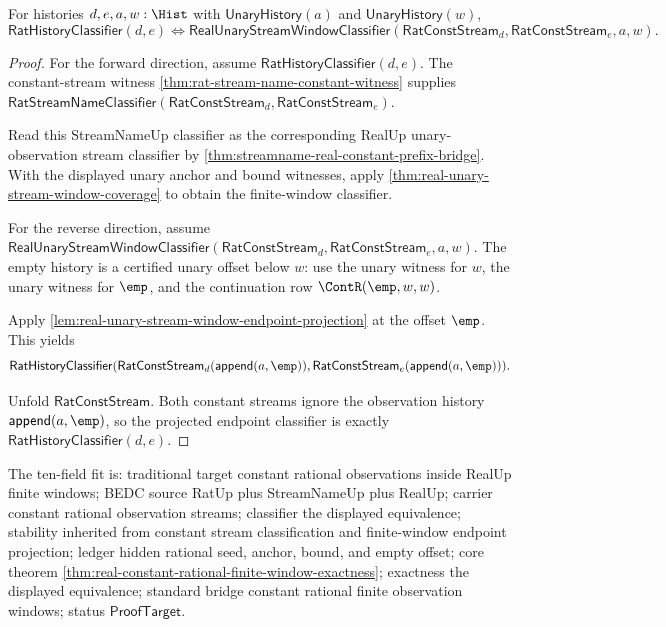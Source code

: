 \begin{theorem}
\label{thm:real-constant-rational-finite-window-exactness}
For histories $d,e,a,w:\Hist$ with $\mathsf{UnaryHistory}(a)$ and
$\mathsf{UnaryHistory}(w)$,
$$
\mathsf{RatHistoryClassifier}(d,e)
\Longleftrightarrow
\mathsf{RealUnaryStreamWindowClassifier}(\mathsf{RatConstStream}_d,
\mathsf{RatConstStream}_e,a,w).
$$
\end{theorem}
\begin{proof}
For the forward direction, assume
$\mathsf{RatHistoryClassifier}(d,e)$. The constant-stream witness
\autoref{thm:rat-stream-name-constant-witness} supplies
$\mathsf{RatStreamNameClassifier}(\mathsf{RatConstStream}_d,
\mathsf{RatConstStream}_e)$.

Read this StreamNameUp classifier as the corresponding RealUp unary-observation
stream classifier by \autoref{thm:streamname-real-constant-prefix-bridge}. With
the displayed unary anchor and bound witnesses, apply
\autoref{thm:real-unary-stream-window-coverage} to obtain the finite-window
classifier.

For the reverse direction, assume
$\mathsf{RealUnaryStreamWindowClassifier}(\mathsf{RatConstStream}_d,
\mathsf{RatConstStream}_e,a,w)$. The empty history is a certified unary offset
below $w$: use the unary witness for $w$, the unary witness for $\emp$, and the
continuation row $\ContR(\emp,w,w)$.

Apply
\autoref{lem:real-unary-stream-window-endpoint-projection} at the offset
$\emp$. This yields
$$
\mathsf{RatHistoryClassifier}(
\mathsf{RatConstStream}_d(\mathsf{append}(a,\emp)),
\mathsf{RatConstStream}_e(\mathsf{append}(a,\emp))).
$$

Unfold $\mathsf{RatConstStream}$. Both constant streams ignore the observation
history $\mathsf{append}(a,\emp)$, so the projected endpoint classifier is
exactly $\mathsf{RatHistoryClassifier}(d,e)$.
\end{proof}

The ten-field fit is: traditional target constant rational observations inside
RealUp finite windows; BEDC source RatUp plus StreamNameUp plus RealUp; carrier
constant rational observation streams; classifier the displayed equivalence;
stability inherited from constant stream classification and finite-window
endpoint projection; ledger hidden rational seed, anchor, bound, and empty
offset; core theorem
\autoref{thm:real-constant-rational-finite-window-exactness}; exactness the
displayed equivalence; standard bridge constant rational finite observation
windows; status $\mathsf{ProofTarget}$.
